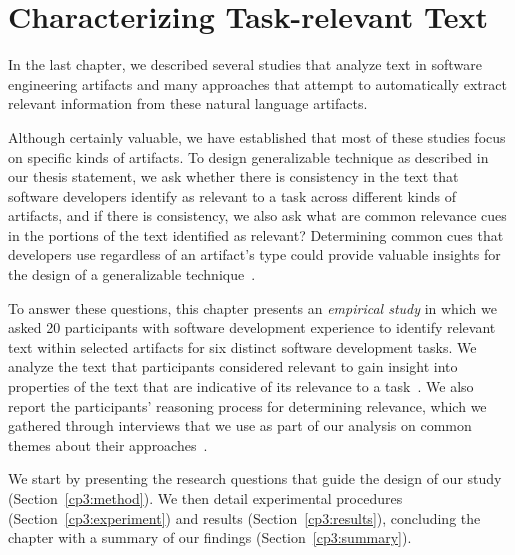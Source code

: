 \setcounter{chapter}{2}


\chapter{Characterizing Task-relevant Text}
\label{ch:characterizing}



In the last chapter,
we described several studies that analyze text in software engineering artifacts
and many approaches that attempt to automatically extract relevant information from
these natural language artifacts.


Although certainly valuable,
we have established that
most of these studies focus on specific kinds of artifacts.
To design
generalizable technique as described in our thesis statement,
we ask whether
there is consistency in the text
that software developers identify as relevant to a task across
different kinds of artifacts, and if there is consistency, we also ask
what are common relevance cues in the portions of
the text identified as relevant?
Determining common cues that
developers use regardless of an artifact's type
could provide valuable
insights for the design of a generalizable 
technique~\cite{Bavota2016}.




To answer these questions, 
this chapter presents an
\textit{empirical study} in which we asked 20 participants with
software development experience to identify relevant text within
selected artifacts for six distinct software development tasks.
We analyze the text that participants considered relevant 
to gain insight into properties of the text 
that are indicative of its relevance to a task~\cite{das2014frame, jurafsky2014speech}. 
We also report the participants'
reasoning process for determining relevance,
which we gathered through interviews
that we use as part of our analysis on
common themes about their approaches~\cite{spencer2009sorting}.



We start by presenting the research questions that guide 
the design of our study (Section~\ref{cp3:method}).
We then detail experimental procedures (Section~\ref{cp3:experiment}) 
and results (Section~\ref{cp3:results}),
concluding the chapter with a summary of our findings (Section~\ref{cp3:summary}).












